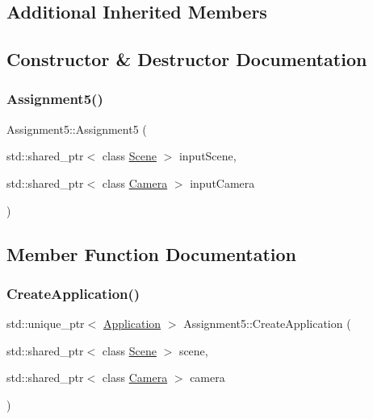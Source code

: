 \subsection*{Additional Inherited Members}


\subsection{Constructor \& Destructor Documentation}
\hypertarget{class_assignment5_aee966f6188c377fd831e6edb97d1ee08}{}\label{class_assignment5_aee966f6188c377fd831e6edb97d1ee08} 
\subsubsection{\texorpdfstring{Assignment5()}{Assignment5()}}
{\footnotesize\ttfamily Assignment5\+::\+Assignment5 (\begin{DoxyParamCaption}\item[{std\+::shared\+\_\+ptr$<$ class \hyperlink{class_scene}{Scene} $>$}]{input\+Scene,  }\item[{std\+::shared\+\_\+ptr$<$ class \hyperlink{class_camera}{Camera} $>$}]{input\+Camera }\end{DoxyParamCaption})}



\subsection{Member Function Documentation}
\hypertarget{class_assignment5_a1b720b74cc23d4f64ced6d2867f2ac63}{}\label{class_assignment5_a1b720b74cc23d4f64ced6d2867f2ac63} 
\subsubsection{\texorpdfstring{Create\+Application()}{CreateApplication()}}
{\footnotesize\ttfamily std\+::unique\+\_\+ptr$<$ \hyperlink{class_application}{Application} $>$ Assignment5\+::\+Create\+Application (\begin{DoxyParamCaption}\item[{std\+::shared\+\_\+ptr$<$ class \hyperlink{class_scene}{Scene} $>$}]{scene,  }\item[{std\+::shared\+\_\+ptr$<$ class \hyperlink{class_camera}{Camera} $>$}]{camera }\end{DoxyParamCaption})\hspace{0.3cm}{\ttfamily [static]}}

